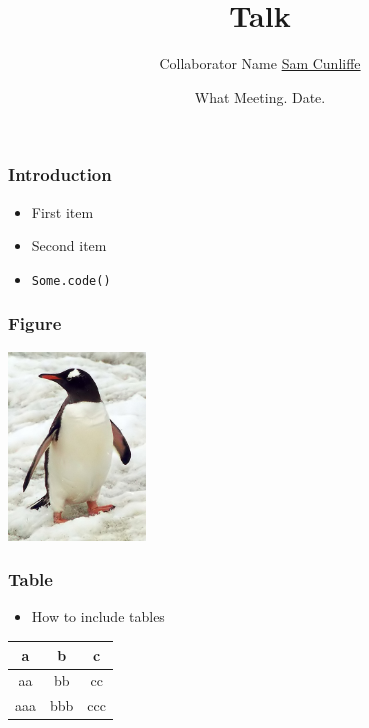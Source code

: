 \documentclass{beamer}
\title{Talk}
\author[S.Cunliffe]{
    Collaborator Name
    \underline{Sam Cunliffe}
}
\institute[Imperial]{Imperial College London}
\date{What Meeting. \hfill Date.}
\begin{document}
    

    \begin{frame}[containsverbatim]\frametitle{Introduction}
      \begin{itemize}
        \item First item
        \item Second item
        \item \verb?Some.code()?
      \end{itemize}
    \end{frame}

    \begin{frame}\frametitle{Figure}
      \includegraphics[height=5cm]{figs/penguin.jpg}
    \end{frame}

    \begin{frame}\frametitle{Table}
      \begin{itemize}
        \item How to include tables
      \end{itemize}
      \begin{tabular}{|c|c|c|}
        \hline
        a & b & c \\
        \hline
        aa & bb & cc \\
        aaa & bbb & ccc \\
        \hline
      \end{tabular}
    \end{frame}
\end{document}
